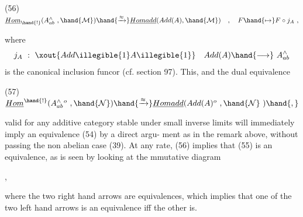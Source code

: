 
(56) \qquad $\underline{Hom}_{\hand{!}}(A^{\wedge}_{ab}\ ,\hand{\mathcal{M}})\hand{\xrightarrow{\approx}}\underline{Homadd}(Add(A),\hand{\mathcal{M}})\quad ,\quad F\hand{\mapsto} F\circ j_A\ ,$

where
\[ j_A\ :\ \xout{Add\illegible{1}A\illegible{1}}\quad Add(A)\hand{\longrightarrow}\ A^{\wedge}_{ab} \]
is the canonical inclusion funcor (cf. section 97). This, and the
dual equivalence 

(57) \qquad $\underline{Hom}^{\hand{!}}(A^{\wedge\ o}_{ab}\ ,\hand{\mathcal{N}})\hand{\xrightarrow{\approx}}\underline{Homadd}(Add(A)^o\ ,\hand{\mathcal{N}}\ )\hand{,}$

valid for any additive category stable under small inverse limits\hand{,} \hand{,} will immediately imply an equivalence (54) by a direct argu-%
ment\hand{,}  as in the remark above, without passing
  the non abelian case (39). At any rate, (56) implies that (55) is an
equivalence, as is seen by looking at the mmutative diagram

\quad ,

where the two right hand arrows are equivalences, which implies that
one of the two left hand arrows is an equivalence iff the other is.


